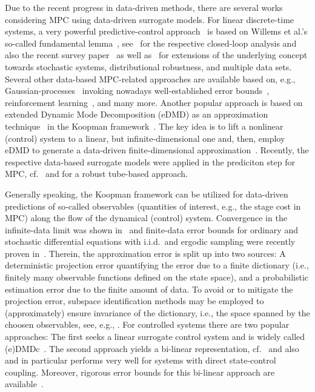 \documentclass{article}
\numberwithin{equation}{section}
\begin{document}
	Due to the recent progress in data-driven methods, there are several works considering MPC using data-driven surrogate models. 
	For linear discrete-time systems, a very powerful predictive-control approach~\cite{CoulLyge19} is based on Willems et al.'s so-called fundamental lemma~\cite{WillRapi05}, see~\cite{BerbKohl20} for the respective closed-loop analysis and also the recent survey paper~\cite{FaulOu23} as well as~\cite{CoulLyge21,WaarPers20} for extensions of the underlying concept towards stochastic systems, distributional robustness, and multiple data sets. 
	Several other data-based MPC-related approaches are available based on, e.g., Gaussian-processes~\cite{HewiKabz19} invoking nowadays well-established error bounds~\cite{CapoLede22}, reinforcement learning~\cite{ZanoGros20}, and many more. 
	Another popular approach is based on extended Dynamic Mode Decomposition (eDMD) \cite{WillKevr15} as an approximation technique~\cite{KlusNusk20} in the Koopman framework~\cite{BevaSosn21}. 
	The key idea is to lift a nonlinear (control) system to a linear, but infinite-dimensional one and, then, employ eDMD to generate a data-driven finite-dimensional approximation~\cite{OttoRowl21}.
	Recently, the respective data-based surrogate models were applied in the prediciton step for MPC, cf.\ \cite{PeitOtto20,KordMezi18b} and \cite{ZhanPan22} for a robust tube-based approach. 
	
	Generally speaking, the Koopman framework can be utilized for data-driven predictions of so-called observables (quantities of interest, e.g.,  
	the stage cost in MPC) along the flow of the dynamical (control) system. Convergence in the infinite-data limit was shown in~\cite{KordMezi18a} and finite-data error bounds for ordinary and stochastic differential equations with i.i.d.\ and ergodic sampling were recently proven in~\cite{SchaWort23,NuskPeit23}. 
	Therein, the approximation error is split up into two sources: A deterministic projection error quantifying the error due to a finite dictionary (i.e., finitely many observable functions defined on the state space), and a probabilistic estimation error due to the finite amount of data. To avoid or to mitigate the projection error, subspace identification methods may be employed to (approximately) ensure invariance of the dictionary, i.e., the space spanned by the choosen observables, see, e.g., \cite{HaseCort21,KrolTell22}.
	For controlled systems there are two popular approaches: The first seeks a linear surrogate control system and is widely called (e)DMDc~\cite{ProcBrun16,KordMezi18b}. The second approach yields a bi-linear representation, cf.\ \cite{Sura16,WillHema2016} and also \cite{BrudFu21} and in particular performs very well for systems with direct state-control coupling. Moreover, rigorous error bounds for this bi-linear approach are available~\cite{SchaWort23,NuskPeit23}.
	
\end{document}
